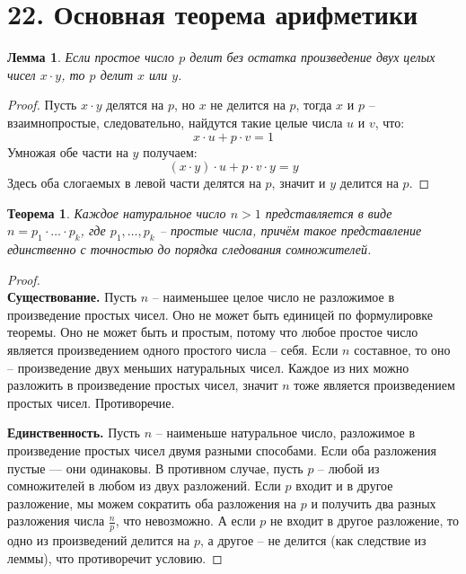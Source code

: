 \documentclass[a4paper,12pt]{article}
\newtheorem*{Lemma}{Лемма}
\newtheorem*{theorem}{Теорема}
\begin{document}
        \section*{22. Основная теорема арифметики}
        \begin{Lemma}
            Если простое число $p$ делит без остатка произведение двух целых чисел $x \cdot y$, то $p$ делит $x$ или $y$.
        \end{Lemma}
        \begin{proof}
            Пусть $x \cdot y$ делятся на $p$, но $x$ не делится на $p$, тогда $x$ и $p$ -- взаимнопростые, следовательно, найдутся такие целые числа $u$ и $v$, что:
            \[
                x\cdot u + p \cdot v = 1
            \]
            Умножая обе части на $y$ получаем:
            \[
                (x\cdot y) \cdot u  + p \cdot v \cdot y = y
            \]
            Здесь оба слогаемых в левой части делятся на $p$, значит и $y$ делится на $p$. 
        \end{proof}
        \begin{theorem}
            Каждое натуральное число $n >1 $ представляется в виде $n=p_1\cdot\ldots\cdot p_k$, где $p_1,\ldots,p_k$ -- простые числа, причём такое представление единственно с точностью до порядка следования сомножителей.
        \end{theorem}
        \begin{proof}\ \\
        \textbf{Существование.} Пусть $n$ -- наименьшее целое число не разложимое в произведение простых чисел. Оно не может быть единицей по формулировке теоремы. Оно не может быть и простым, потому что любое простое число является произведением одного простого числа -- себя. Если $n$ составное, то оно -- произведение двух меньших натуральных чисел. Каждое из них можно разложить в произведение простых чисел, значит $n$ тоже является произведением простых чисел. Противоречие.

        \noindent\textbf{Единственность.} Пусть $n$ -- наименьше натуральное число, разложимое в произведение простых чисел двумя разными способами. Если оба разложения пустые — они одинаковы. В противном случае, пусть $p$ -- любой из сомножителей в любом из двух разложений. Если $p$ входит и в другое разложение, мы можем сократить оба разложения на $p$ и получить два разных разложения числа $\displaystyle\frac{n}{p}$, что невозможно. А если $p$ не входит в другое разложение, то одно из произведений делится на $p$, а другое -- не делится (как следствие из леммы), что противоречит условию.
        \end{proof}
\end{document}
